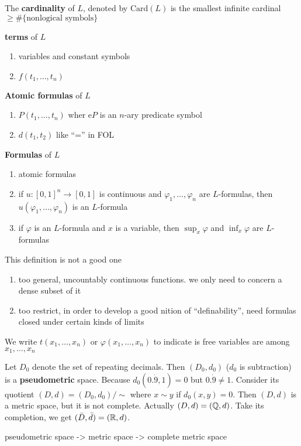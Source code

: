 \documentclass[11pt]{article}
\def \Card {\text{Card}}
\begin{document}
The \textbf{cardinality} of \(L\), denoted by \(\Card(L)\) is the smallest infinite cardinal
\(\ge\#\{\text{nonlogical symbols}\}\)

\textbf{terms} of \(L\)
\begin{enumerate}
\item variables and constant symbols
\item \(f(t_1,\dots,t_n)\)
\end{enumerate}


\textbf{Atomic formulas} of \(L\)
\begin{enumerate}
\item \(P(t_1,\dots,t_n)\) wher e\(P\) is an \(n\)-ary predicate symbol
\item \(d(t_1,t_2)\) like ``='' in FOL
\end{enumerate}


\textbf{Formulas} of \(L\)
\begin{enumerate}
\item atomic formulas
\item if \(u:[0,1]^n\to[0,1]\) is continuous and \(\varphi_1,\dots,\varphi_n\) are \(L\)-formulas,
then \(u(\varphi_1,\dots,\varphi_n)\) is an \(L\)-formula
\item if \(\varphi\) is an \(L\)-formula and \(x\) is a variable, then \(\sup_x\varphi\) and \(\inf_x\varphi\)
are \(L\)-formulas
\end{enumerate}


This definition is not a  good one
\begin{enumerate}
\item too general, uncountably continuous functions. we only need to concern a dense subset of it
\item too restrict, in order to develop a good nition of ``definability'', need formulas closed under
certain kinds of limits
\end{enumerate}


We write \(t(x_1,\dots,x_n)\) or \(\varphi(x_1,\dots,x_n)\) to indicate is free variables are
among \(x_1,\dots,x_n\)

\begin{examplle}[]
Let \(D_0\) denote the set of repeating decimals. Then \((D_0,d_0)\) (\(d_0\) is subtraction) is
a \textbf{pseudometric} space. Because \(d_0(0.\dot{9},1)=0\) but \(0.\dot{9}\neq1\). Consider its
quotient \((D,d)=(D_0,d_0)/\sim\) where \(x\sim y\) if \(d_0(x,y)=0\). Then \((D,d)\) is a metric
space, but it is not complete. Actually \((D,d)=(\mathbb{Q},d)\). Take its completion, we
get \((\bar{D},\bar{d})=(\mathbb{R},d)\).

pseudometric space -> metric space -> complete metric space
\end{examplle}
\end{document}
